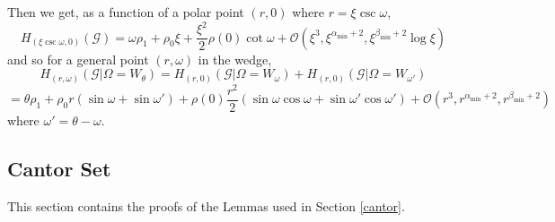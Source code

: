 \documentclass{article}
\newcommand{\graph}{\mathcal{G}}
\newcommand{\bigO}[1]{\mathcal{O}\left(#1\right)}
\begin{document}
Then we get, as a function of a polar point $(r,0)$ where $r = \xi \csc \omega$,
\begin{equation}
    H_{(\xi \csc \omega, 0)}(\graph) =  \omega \rho_1 + \rho_0 \xi + \frac{\xi^2}{2}\rho(0)\cot \omega + \bigO{\xi^3, \xi^{\alpha_{\min}+2}, \xi^{\beta_{\min}+2}\log \xi} 
\end{equation}
and so for a general point $(r, \omega)$ in the wedge,
\begin{equation}
    H_{(r, \omega)}(\graph|\Omega=W_\theta) = H_{(r, 0)}(\graph | \Omega=W_{\omega}) + H_{(r, 0)}(\graph|\Omega = W_{\omega'})
\end{equation}
\begin{equation}
    = \theta \rho_1 + \rho_0 r(\sin \omega + \sin \omega') + \rho(0) \frac{r^2}{2}(\sin \omega \cos \omega + \sin \omega' \cos \omega') + \bigO{r^3, r^{\alpha_{\min}+2}, r^{\beta_{\min}+2}} 
\end{equation}
where $\omega' = \theta -\omega$.

\subsection{Cantor Set}
\label{app:cantor}
This section contains the proofs of the Lemmas used in Section \ref{cantor}. 
\end{document}
